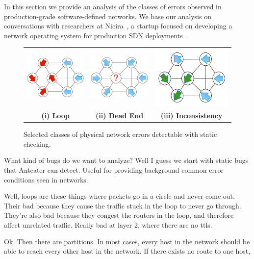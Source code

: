 
In this section we provide an analysis of the classes of errors observed in
production-grade software-defined networks. We base our analysis on conversations with
researchers at Nicira~\cite{nicira}, a startup focused on developing a network operating
system for production SDN deployments~\cite{onix}.

\begin{figure}[t]
    \centering
    \begin{tabular}{ccc}
    \hspace{-5pt}\includegraphics[width=.9in]{../diagrams/bugs/loop.pdf}&
    \includegraphics[width=.9in]{../diagrams/bugs/dead_end.pdf}&
    \includegraphics[width=.9in]{../diagrams/bugs/routing_inconsistency.pdf}\\
    {\bf (i) Loop}&{\bf (ii) Dead End}&{\bf (iii) Inconsistency}\\
    \end{tabular}
    \caption[]{\label{fig:invariantviolations} Selected classes of physical network errors detectable with static
    checking.\vspace{-10pt}} 
\end{figure}


What kind of bugs do we want to analyze? Well I guess we start with static
bugs that Anteater can detect. Useful for providing background common error
conditions seen in networks. 

Well, loops are these things where packets go in a circle and never come out.
Their bad because they cause the traffic stuck in the loop to never go
through. They're also bad because they congest the routers in the loop, and
therefore affect unrelated traffic. Really bad at layer 2, where there are no
ttls.

Ok. Then there are partitions. In most cases, every host in the network should
be able to reach every other host in the network. If there exists no route to
one host, 


